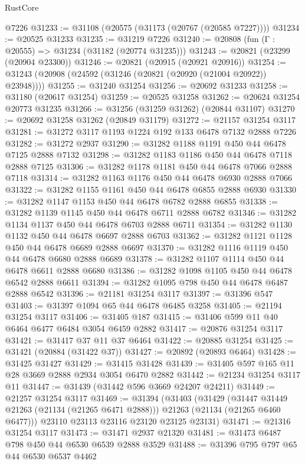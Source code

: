 \begin{lexlean}{RustCore}
\begin{coremodule}
    @7226
@31233 := @31108 (@20575 (@31173 (@20767 (@20585 @7227))))
@31234 := @20525 @31233
@31235 := @31219 @7226
@31240 := @20808 (fun (Γ : @20555) => @31234 (@31182 (@20774 @31235)))
@31243 := @20821 (@23299 (@20904 @23300))
@31246 := @20821 (@20915 (@20921 @20916))
@31254 := @31243 (@20908 (@24592 (@31246 (@20821 (@20920 (@21004 @20922)) @23948))))
@31255 := @31240 @31254
@31256 := @20692 @31233
@31258 := @31180 (@20617 @31254)
@31259 := @20525 @31258
@31262 := @20624 @31254 @20773 @31235
@31266 := @31256 (@31259 @31262) (@20844 @31107)
@31270 := @20692 @31258 @31262 (@20849 @31179)
@31272 := @21157 @31254 @3117
@31281 := @31272 @3117 @1193 @1224 @192 @133 @6478 @7132 @2888 @7226
@31282 := @31272 @2937
@31290 := @31282 @1188 @1191 @450 @44 @6478 @7125 @2888 @7132
@31298 := @31282 @1183 @1186 @450 @44 @6478 @7118 @2888 @7125
@31306 := @31282 @1178 @1181 @450 @44 @6478 @7066 @2888 @7118
@31314 := @31282 @1163 @1176 @450 @44 @6478 @6930 @2888 @7066
@31322 := @31282 @1155 @1161 @450 @44 @6478 @6855 @2888 @6930
@31330 := @31282 @1147 @1153 @450 @44 @6478 @6782 @2888 @6855
@31338 := @31282 @1139 @1145 @450 @44 @6478 @6711 @2888 @6782
@31346 := @31282 @1134 @1137 @450 @44 @6478 @6703 @2888 @6711
@31354 := @31282 @1130 @1132 @450 @44 @6478 @6697 @2888 @6703
@31362 := @31282 @1121 @1128 @450 @44 @6478 @6689 @2888 @6697
@31370 := @31282 @1116 @1119 @450 @44 @6478 @6680 @2888 @6689
@31378 := @31282 @1107 @1114 @450 @44 @6478 @6611 @2888 @6680
@31386 := @31282 @1098 @1105 @450 @44 @6478 @6542 @2888 @6611
@31394 := @31282 @1095 @798 @450 @44 @6478 @6487 @2888 @6542
@31396 := @21181 @31254 @3117
@31397 := @31396 @547
@31403 := @31397 @1094 @65 @44 @6478 @6485 @3258
@31405 := @21194 @31254 @3117
@31406 := @31405 @187
@31415 := @31406 @599 @11 @40 @6464 @6477 @6484 @3054 @6459 @2882
@31417 := @20876 @31254 @3117
@31421 := @31417 @37 @11 @37 @6464
@31422 := @20885 @31254
@31425 := @31421 (@20884 (@31422 @37))
@31427 := @20892 (@20893 @6464)
@31428 := @31425 @31427
@31429 := @31415 @31428
@31439 := @31405 @597 @165 @11 @28 @3669 @2888 @2934 @3054 @6470 @2882
@31442 := @21234 @31254 @3117 @11
@31447 := @31439 (@31442 @596 @3669 @24207 @24211)
@31449 := @21257 @31254 @3117
@31469 := @31394
    (@31403
      (@31429
        (@31447 @31449 @21263 (@21134 (@21265 @6471 @2888)))
        @21263
        (@21134 (@21265 @6460 @6477)))
      @23110
      @23113
      @23116
      @23120
      @23125
      @23131)
@31471 := @21316 @31254 @3117
@31473 := @31471 @2937 @21320
@31481 := @31473 @6487 @798 @450 @44 @6530 @6539 @2888 @3529
@31488 := @31396 @795 @797 @65 @44 @6530 @6537 @4462

\end{coremodule}
\end{lexlean}

